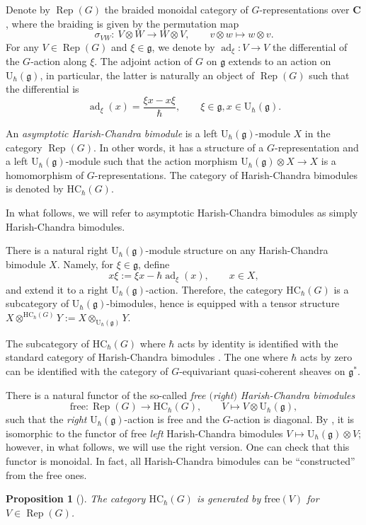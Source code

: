 \documentclass[11pt]{article}
\numberwithin{equation}{section}
\newtheorem{Proposition}[Theorem]{Proposition}
{ \theoremstyle{definition}
	\newtheorem{Definition}[Theorem]{Definition}
	\newtheorem{Note}[Theorem]{Note}
	\newtheorem{Example}[Theorem]{Example}
	\newtheorem{Remark}[Theorem]{Remark} }
\newcommand{\C}{\mathbf{C}}
\newcommand{\U}{\mathrm{U}_{\hbar}}
\newcommand{\g}{\mathfrak{g}}
\DeclareMathOperator{\ad}{ad}
\newcommand{\free}{\mathrm{free}}
\newcommand{\HC}{\mathrm{HC}_{\hbar}}
\DeclareMathOperator{\Rep}{Rep}
\begin{document}
	Denote by $\Rep(G)$ the braided monoidal category of $G$-representations over $\C$, where the braiding is given by the permutation map
	\[
	\sigma_{VW} \colon\ V \otimes W \rightarrow W \otimes V, \qquad v\otimes w \mapsto w \otimes v.
	\]
	For any $V \in \Rep(G)$ and $\xi\in \g$, we denote by $\ad_{\xi} \colon V \rightarrow V$ the differential of the $G$-action along $\xi$. The adjoint action of $G$ on $\g$ extends to an action on $\U(\g)$, in particular, the latter is naturally an object of $\Rep(G)$ such that the differential is
	\begin{equation*}
		\ad_{\xi}(x) = \frac{\xi x - x \xi}{\hbar},\qquad \xi\in \g, x\in \U(\g).
	\end{equation*}
	
	\begin{Definition}
		An \emph{asymptotic Harish-Chandra bimodule} is a left $\U(\g)$-module $X$ in the category $\Rep(G)$. In other words, it has a structure of a $G$-representation and a left $\U(\g)$-module such that the action morphism
		$
		\U(\g) \otimes X \rightarrow X
		$
		is a homomorphism of $G$-representations. The category of Harish-Chandra bimodules is denoted by $\HC(G)$.
	\end{Definition}
	
	In what follows, we will refer to asymptotic Harish-Chandra bimodules as simply Harish-Chandra bimodules.
	
	There is a natural right $\U(\g)$-module structure on any Harish-Chandra bimodule $X$. Namely, for $\xi \in\g$, define
	\begin{equation}
		\label{eq::left_action}
		x\xi := \xi x - \hbar \ad_{\xi}(x),\qquad x\in X,
	\end{equation}
	and extend it to a right $\U(\g)$-action. Therefore, the category $\HC(G)$ is a subcategory of $\U(\g)$-bimodules, hence is equipped with a tensor structure
$
	X \otimes^{\HC(G)} Y := X \otimes_{\U(\g)} Y$.
	
	\begin{Remark}
		The subcategory of $\HC(G)$ where $\hbar$ acts by identity is identified with the standard category of Harish-Chandra bimodules \cite[Definition 5.2]{BernsteinGelfand}. The one where $\hbar$ acts by zero can be identified with the category of $G$-equivariant quasi-coherent sheaves on $\g^*$.
	\end{Remark}
	
	There is a natural functor of the so-called \emph{free $($right$)$ Harish-Chandra bimodules}
	\[
	\free \colon \Rep(G) \rightarrow \HC(G), \qquad V \mapsto V \otimes \U(\g),
	\]
	such that the \emph{right} $\U(\g)$-action is free and the $G$-action is diagonal. By \cite[equation~(28)]{KalmykovSafronov}, it is isomorphic to the functor of free \emph{left} Harish-Chandra bimodules $V \mapsto \U(\g) \otimes V$; however, in what follows, we will use the right version. One can check that this functor is monoidal. In fact, all Harish-Chandra bimodules can be ``constructed'' from the free ones.
	\begin{Proposition}[{\cite[Proposition 2.7]{KalmykovSafronov}}]
		\label{prop::hc_generators}
		The category $\HC(G)$ is generated by $\free(V)$ for $V \in \Rep(G)$.
	\end{Proposition}
	
\end{document}
